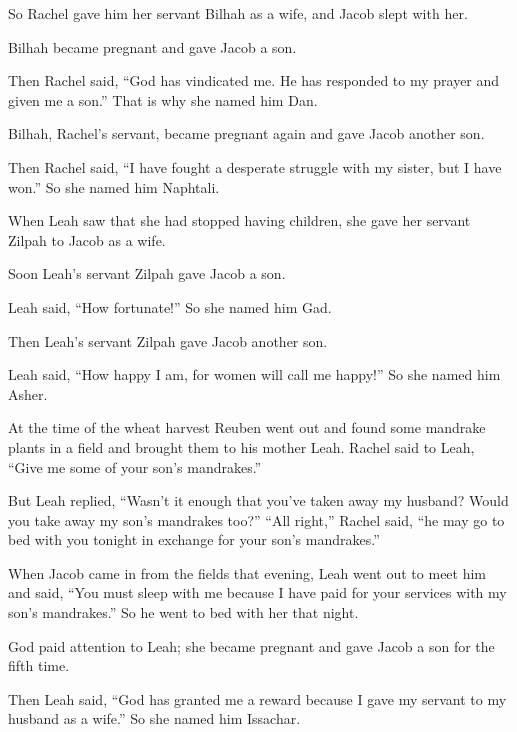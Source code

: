 \begin{scripture}
 So Rachel gave him her servant Bilhah as a wife, and Jacob slept with her.
 Bilhah became pregnant and gave Jacob a son.
 Then Rachel said, ``God has vindicated me. He has responded to my prayer and given me a son.'' That is why she named him Dan.
\everypar{}

 Bilhah, Rachel's servant, became pregnant again and gave Jacob another son.
 Then Rachel said, ``I have fought a desperate struggle with my sister, but I have won.'' So she named him Naphtali.
\everypar{}

 When Leah saw that she had stopped having children, she gave her servant Zilpah to Jacob as a wife.
 Soon Leah's servant Zilpah gave Jacob a son.
 Leah said, ``How fortunate!'' So she named him Gad.
\everypar{}

 Then Leah's servant Zilpah gave Jacob another son.
 Leah said, ``How happy I am, for women will call me happy!'' So she named him Asher.
\everypar{}

 At the time of the wheat harvest Reuben went out and found some mandrake plants in a field and brought them to his mother Leah. Rachel said to Leah, ``Give me some of your son's mandrakes.''
 But Leah replied, ``Wasn't it enough that you've taken away my husband? Would you take away my son's mandrakes too?'' ``All right,'' Rachel said, ``he may go to bed with you tonight in exchange for your son's mandrakes.''
 When Jacob came in from the fields that evening, Leah went out to meet him and said, ``You must sleep with me because I have paid for your services with my son's mandrakes.'' So he went to bed with her that night.
 God paid attention to Leah; she became pregnant and gave Jacob a son for the fifth time.
 Then Leah said, ``God has granted me a reward because I gave my servant to my husband as a wife.'' So she named him Issachar.
\everypar{}


\end{scripture}
